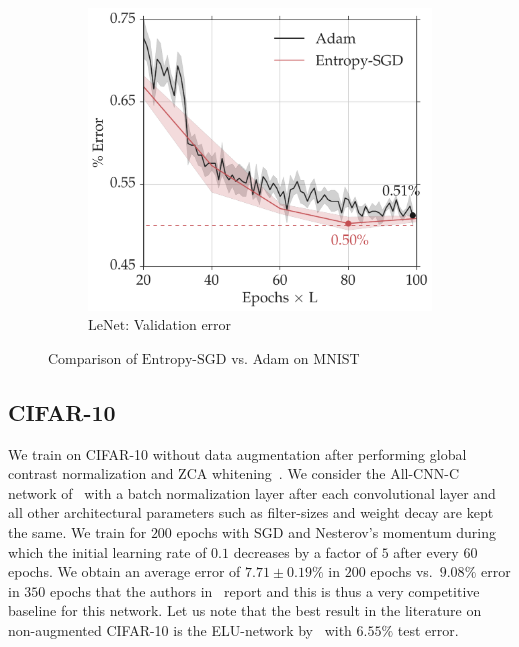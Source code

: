 \documentclass[10pt]{article}
\newcommand{\entropysgd}{\mathrm{Entropy}\textrm{-}\mathrm{SGD}}
\newcommand{\lenet}{\textrm{LeNet}}
\begin{document}
\begin{figure}[htp!]
\begin{subfigure}[t]{0.45\textwidth}
        \includegraphics[width=\textwidth]{lenet_valid.pdf}
        \caption{\small $\lenet$: Validation error}
        \label{fig:lenet_test}
    \end{subfigure}
\caption{\small Comparison of $\entropysgd$ vs. Adam on MNIST\vspace*{0.15in}}
\label{fig:mnist_test}
\end{figure}

\subsection{CIFAR-10}
\label{ss:expt:cifar}

We train on CIFAR-10 without data augmentation after performing global contrast normalization and ZCA whitening~\citep{goodfellow2013maxout}. We consider the All-CNN-C network of~\citet{springenberg2014striving} with a batch normalization layer after each convolutional layer and all other architectural parameters such as filter-sizes and weight decay are kept the same. We train for $200$ epochs with SGD and Nesterov's momentum during which the initial learning rate of $0.1$ decreases by a factor of $5$ after every $60$ epochs. We obtain an average error of $7.71 \pm 0.19\%$ in $200$ epochs vs.\ $9.08\%$ error in $350$ epochs that the authors in~\citet{springenberg2014striving} report and this is thus a very competitive baseline for this network. Let us note that the best result in the literature on non-augmented CIFAR-10 is the ELU-network by~\citet{clevert2015fast} with $6.55\%$ test error.
\end{document}
